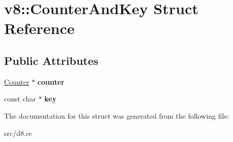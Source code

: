 \hypertarget{structv8_1_1_counter_and_key}{}\section{v8\+:\+:Counter\+And\+Key Struct Reference}
\label{structv8_1_1_counter_and_key}
\subsection*{Public Attributes}
\begin{DoxyCompactItemize}
\item 
\hypertarget{structv8_1_1_counter_and_key_aa2d9bb18791cf1e45607f17b3dc48d36}{}\hyperlink{classv8_1_1_counter}{Counter} $\ast$ {\bfseries counter}\label{structv8_1_1_counter_and_key_aa2d9bb18791cf1e45607f17b3dc48d36}

\item 
\hypertarget{structv8_1_1_counter_and_key_af22129bbaba86a7188a30995db746bb9}{}const char $\ast$ {\bfseries key}\label{structv8_1_1_counter_and_key_af22129bbaba86a7188a30995db746bb9}

\end{DoxyCompactItemize}


The documentation for this struct was generated from the following file\+:\begin{DoxyCompactItemize}
\item 
src/d8.\+cc\end{DoxyCompactItemize}
